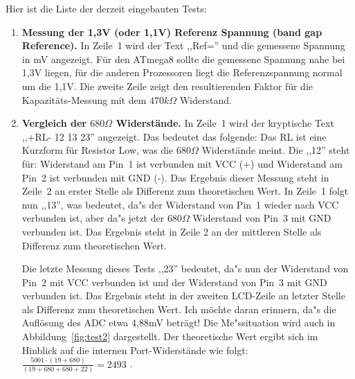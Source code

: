 \vspace{1cm}
Hier ist die Liste der derzeit eingebauten Tests:
\vspace{1cm}
\begin{enumerate}
\item {\bf Messung der 1,3V (oder 1,1V) Referenz Spannung (band gap Reference).} In Zeile~1 wird der Text ,,Ref='' und die
gemessene Spannung in mV angezeigt.
F\"ur den ATmega8 sollte die gemessene Spannung nahe bei 1,3V liegen, f\"ur die anderen Prozessoren liegt
die Referenzspannung normal um die 1,1V.
Die zweite Zeile zeigt den resultierenden Faktor f\"ur die Kapazit\"ats-Messung mit dem \(470k\Omega\) Widerstand.
\item {\bf Vergleich der \(680\Omega\) Widerst\"ande.} 
In Zeile~1 wird der kryptische Text  ,,+RL- 12 13 23'' angezeigt. Das bedeutet das folgende:
Das RL ist eine Kurzform f\"ur Resistor Low, was die \(680\Omega\) Widerst\"ande meint. Die ,,12'' steht f\"ur: 
Widerstand am Pin~1 ist verbunden mit VCC (+) und Widerstand am Pin~2 ist verbunden mit GND (-). 
Das Ergebnis dieser Messung steht in Zeile~2 an erster Stelle als Differenz zum theoretischen Wert.
 In Zeile~1 folgt nun ,,13'', was bedeutet, da"s der Widerstand von Pin~1 wieder nach VCC verbunden ist,
aber da"s jetzt der \(680\Omega\) Widerstand von Pin~3  mit GND verbunden ist.
Das Ergebnis steht in Zeile 2 an der mittleren Stelle als Differenz zum theoretischen Wert.

Die letzte Messung dieses Tests ,,23'' bedeutet, da"s nun der Widerstand von Pin~2 mit VCC verbunden ist und
der Widerstand von Pin~3 mit GND verbunden ist.
Das Ergebnis steht in der zweiten LCD-Zeile an letzter Stelle als Differenz zum theoretischen Wert.
Ich m\"ochte daran erinnern, da"s die Aufl\"osung des ADC etwa 4,88mV betr\"agt!
Die Me"ssituation wird auch in Abbildung~\ref{fig:test2} dargestellt.
Der theoretische Wert ergibt sich im Hinblick auf die internen Port-Widerst\"ande wie folgt:
\(\frac{5001 \cdot  (19+680)}{ (19+680+680+22)} = 2493\) .


\end{enumerate}

